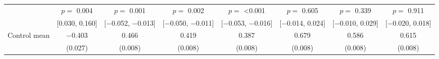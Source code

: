 \begin{tabular}[t]{lccccccc}
 & $p =$ \num{0.004} & $p =$ \num{0.001} & $p =$ \num{0.002} & $p =$ \num{<0.001} & $p =$ \num{0.605} & $p =$ \num{0.339} & $p =$ \num{0.911}\\
 & {}[\num{0.030}, \num{0.160}] & {}[\num{-0.052}, \num{-0.013}] & {}[\num{-0.050}, \num{-0.011}] & {}[\num{-0.053}, \num{-0.016}] & {}[\num{-0.014}, \num{0.024}] & {}[\num{-0.010}, \num{0.029}] & {}[\num{-0.020}, \num{0.018}]\\\hline
\hspace{1em}Control mean & \num{-0.403} & \num{0.466} & \num{0.419} & \num{0.387} & \num{0.679} & \num{0.586} & \num{0.615}\\
 & (\num{0.027}) & (\num{0.008}) & (\num{0.008}) & (\num{0.008}) & (\num{0.008}) & (\num{0.008}) & (\num{0.008})\\
\end{tabular}
